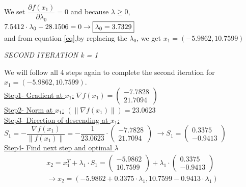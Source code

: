 We set $\dfrac{\partial f(x_1)}{\partial \lambda_0} = 0$ and because $\lambda \geq 0$,\\

$7.5412 \cdot \lambda_0-28.1506 = 0 \rightarrow \fbox{{\(\lambda_0 = 3.7329\)}}$ \\

and from equation \ref{eq},by replacing the $\lambda_0$, we get $x_1 = (-5.9862,10.7599)$
\\[2mm]
\begin{center}
	\textit{SECOND ITERATION k = 1}
\end{center} 
We will follow all 4 steps again to complete the second iteration for $x_1 = (-5.9862,10.7599)$.\\

\underline{Step1- Gradient at $x_1$:}
$\nabla f(x_1) = \left(\begin{array}{c}
	-7.7828\\
	21.7094
\end{array}\right)$\\

\underline{Step2- Norm at $x_1$:}
$(\|\nabla f(x_1)\|) = 23.0623$\\

\underline{Step3- Direction of descending at $x_1$:}
 $S_1 = -\dfrac{\nabla f(x_1)}{\|f(x_1)\|} = -\dfrac{1}{23.0623} \cdot \left(\begin{array}{c}
	-7.7828\\
	21.7094
\end{array}\right)$ $\rightarrow S_1 = \left(\begin{array}{c}
	0.3375 \\
	-0.9413
\end{array}\right)$\\

\underline{Step4- Find next step and optimal $\lambda$}\\[2mm]
\begin{equation}
	\begin{gathered}
	x_2 = x_1^T + \lambda_1 \cdot S_1 = \left(\begin{array}{c}
	    -5.9862 \\
		10.7599
	\end{array}\right) + \lambda_1 \cdot  \left(\begin{array}{c}
		0.3375 \\
		-0.9413
	\end{array}\right) \\[1mm]
	\rightarrow x_2 = \left(-5.9862+0.3375 \cdot \lambda_1, 10.7599-0.9413 \cdot \lambda_1\right)		
\end{gathered}
\label{eq5}
\end{equation}
\\[0.5mm]

